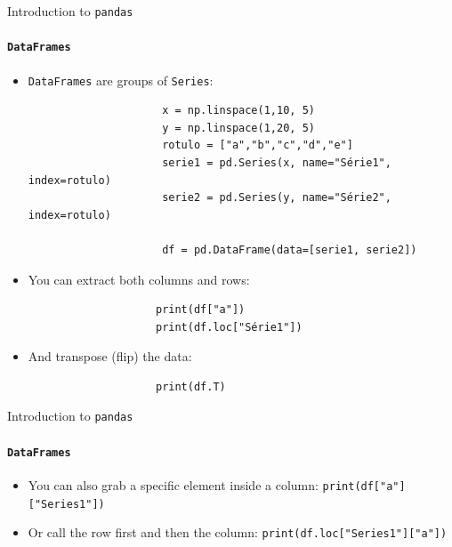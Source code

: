 \documentclass[notes,11pt, aspectratio=169, xcolor=table]{beamer}
\begin{document}
        \begin{frame}[fragile=singleslide]{Introduction to \texttt{pandas}}
        \framesubtitle{\texttt{DataFrames}}
            
             \begin{itemize}
    
                \item \texttt{DataFrames} are groups of \texttt{Series}:
    
                    \begin{verbatim}
                     x = np.linspace(1,10, 5)
                     y = np.linspace(1,20, 5)
                     rotulo = ["a","b","c","d","e"]
                     serie1 = pd.Series(x, name="Série1", index=rotulo)
                     serie2 = pd.Series(y, name="Série2", index=rotulo)
                     
                     df = pd.DataFrame(data=[serie1, serie2])
                    \end{verbatim}
                    
                \item You can extract both columns and rows:
                
                \begin{verbatim}
                    print(df["a"])
                    print(df.loc["Série1"])
                \end{verbatim}

                \item And transpose (flip) the data:
                
                \begin{verbatim}
                    print(df.T)
                \end{verbatim}
                    
            \end{itemize}             

        \end{frame}    

        \begin{frame}[fragile=singleslide]{Introduction to \texttt{pandas}}
        \framesubtitle{\texttt{DataFrames}}
            
             \begin{itemize}
    
                \item You can also grab a specific element inside a column: \texttt{print(df["a"]["Series1"])}

                \item Or call the row first and then the column: \texttt{print(df.loc["Series1"]["a"])}
        
            \end{itemize}             

        \end{frame}    
\end{document}
